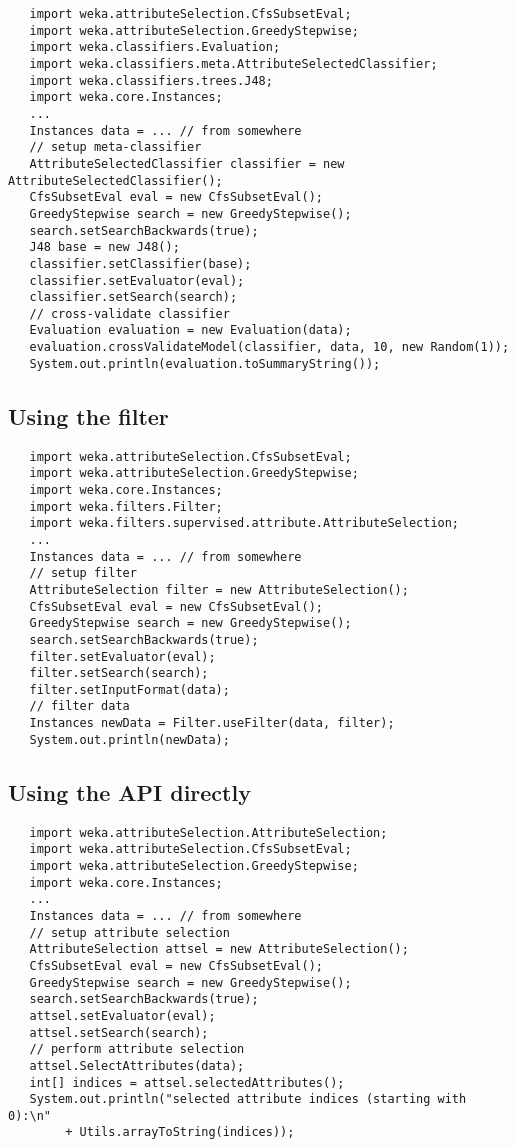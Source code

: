 \begin{verbatim}
   import weka.attributeSelection.CfsSubsetEval;
   import weka.attributeSelection.GreedyStepwise;
   import weka.classifiers.Evaluation;
   import weka.classifiers.meta.AttributeSelectedClassifier;
   import weka.classifiers.trees.J48;
   import weka.core.Instances;
   ...
   Instances data = ... // from somewhere
   // setup meta-classifier
   AttributeSelectedClassifier classifier = new AttributeSelectedClassifier();
   CfsSubsetEval eval = new CfsSubsetEval();
   GreedyStepwise search = new GreedyStepwise();
   search.setSearchBackwards(true);
   J48 base = new J48();
   classifier.setClassifier(base);
   classifier.setEvaluator(eval);
   classifier.setSearch(search);
   // cross-validate classifier
   Evaluation evaluation = new Evaluation(data);
   evaluation.crossValidateModel(classifier, data, 10, new Random(1));
   System.out.println(evaluation.toSummaryString());
\end{verbatim}

\newpage

\subsection{Using the filter}

\begin{verbatim}
   import weka.attributeSelection.CfsSubsetEval;
   import weka.attributeSelection.GreedyStepwise;
   import weka.core.Instances;
   import weka.filters.Filter;
   import weka.filters.supervised.attribute.AttributeSelection;
   ...
   Instances data = ... // from somewhere
   // setup filter
   AttributeSelection filter = new AttributeSelection();
   CfsSubsetEval eval = new CfsSubsetEval();
   GreedyStepwise search = new GreedyStepwise();
   search.setSearchBackwards(true);
   filter.setEvaluator(eval);
   filter.setSearch(search);
   filter.setInputFormat(data);
   // filter data
   Instances newData = Filter.useFilter(data, filter);
   System.out.println(newData);
\end{verbatim}

\newpage

\subsection{Using the API directly}

\begin{verbatim}
   import weka.attributeSelection.AttributeSelection;
   import weka.attributeSelection.CfsSubsetEval;
   import weka.attributeSelection.GreedyStepwise;
   import weka.core.Instances;
   ...
   Instances data = ... // from somewhere
   // setup attribute selection
   AttributeSelection attsel = new AttributeSelection();
   CfsSubsetEval eval = new CfsSubsetEval();
   GreedyStepwise search = new GreedyStepwise();
   search.setSearchBackwards(true);
   attsel.setEvaluator(eval);
   attsel.setSearch(search);
   // perform attribute selection
   attsel.SelectAttributes(data);
   int[] indices = attsel.selectedAttributes();
   System.out.println("selected attribute indices (starting with 0):\n"
        + Utils.arrayToString(indices));
\end{verbatim}

